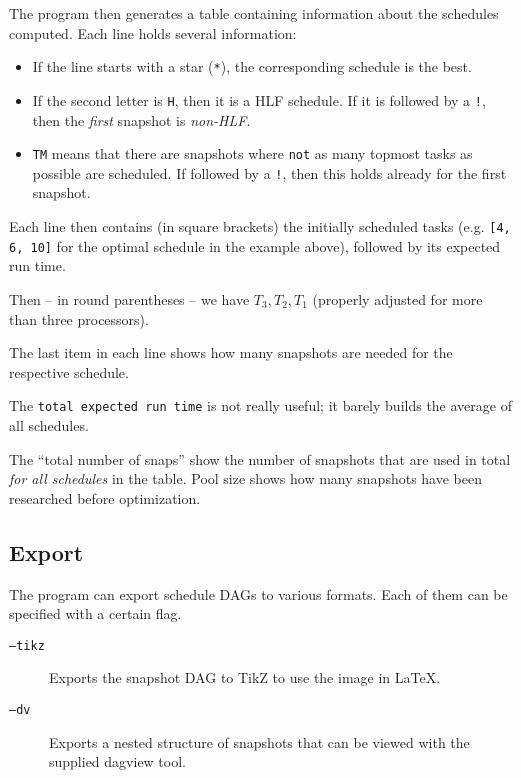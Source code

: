 \documentclass[usletter]{article}
\begin{document}
The program then generates a table containing information about the schedules computed. Each line holds several information:

\begin{itemize}
\item If the line starts with a star (\texttt{*}), the corresponding schedule is the best.
\item If the second letter is \texttt{H}, then it is a HLF schedule. If it is followed by a \texttt{!}, then the \emph{first} snapshot is \emph{non-HLF}.
\item \texttt{TM} means that there are snapshots where \texttt{not} as many topmost tasks as possible are scheduled. If followed by a \texttt{!}, then this holds already for the first snapshot.
\end{itemize}

Each line then contains (in square brackets) the initially scheduled tasks (e.g. \texttt{[4, 6, 10]} for the optimal schedule in the example above), followed by its expected run time.

Then -- in round parentheses -- we have $T_3, T_2, T_1$ (properly adjusted for more than three processors).

The last item in each line shows how many snapshots are needed for the respective schedule.

The \texttt{total expected run time} is not really useful; it barely builds the average of all schedules.

The ``total number of snaps'' show the number of snapshots that are used in total \emph{for all schedules} in the table. Pool size shows how many snapshots have been researched before optimization.

\subsection{Export}

The program can export schedule DAGs to various formats. Each of them can be specified with a certain flag.

\begin{description}
\item[\texttt{--tikz}] Exports the snapshot DAG to TikZ to use the image in \LaTeX.
\item[\texttt{--dv}] Exports a nested structure of snapshots that can be viewed with the supplied dagview tool.
\end{description}
\end{document}
